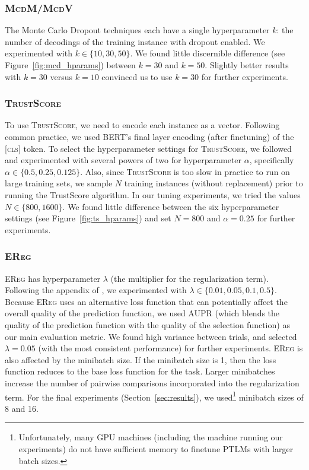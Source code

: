 \documentclass[11pt]{article}
\begin{document}
\subsubsection*{\textsc{McdM/McdV}}

The Monte Carlo Dropout techniques each have a single hyperparameter $k$: the number of decodings of the training instance with dropout enabled. We experimented with $k \in \{10, 30, 50\}$. We found little discernible difference (see Figure~\ref{fig:mcd_hparams}) between $k=30$ and $k=50$. Slightly better results with $k=30$ versus $k=10$ convinced us to use $k=30$ for further experiments.


\subsubsection*{\textsc{TrustScore}}

To use \textsc{TrustScore}, we need to encode each instance as a vector. Following common practice, we used BERT's final layer encoding (after finetuning) of the \textsc{[cls]} token. To select the hyperparameter settings for \textsc{TrustScore}, we followed \cite{jiang2018trust} and experimented with several powers of two for hyperparameter $\alpha$, specifically $\alpha \in \{0.5, 0.25, 0.125\}$. Also, since \textsc{TrustScore} is too slow in practice to run on large training sets, we sample $N$ training instances (without replacement) prior to running the TrustScore algorithm. In our tuning experiments, we tried the values $N \in \{800, 1600\}$. We found little difference between the six hyperparameter settings (see Figure~\ref{fig:ts_hparams}) and set $N=800$ and $\alpha=0.25$ for further experiments.

\subsubsection*{\textsc{EReg}}

\textsc{EReg} has hyperparameter $\lambda$ (the multiplier for the regularization term). Following the appendix of \cite{xin-etal-2021-art}, we experimented with $\lambda \in \{0.01, 0.05, 0.1, 0.5\}$. Because \textsc{EReg} uses an alternative loss function that can potentially affect the overall quality of the prediction function, we used AUPR (which blends the quality of the prediction function with the quality of the selection function) as our main evaluation metric. We found high variance between trials, and selected $\lambda = 0.05$ (with the most consistent performance) for further experiments. \textsc{EReg} is also affected by the minibatch size. If the minibatch size is 1, then the loss function reduces to the base loss function for the task. Larger minibatches increase the number of pairwise comparisons incorporated into the regularization term. For the final experiments (Section~\ref{sec:results}), we used\footnote{Unfortunately, many GPU machines (including the machine running our experiments) do not have sufficient memory to finetune PTLMs with larger batch sizes.} minibatch sizes of 8 and 16.
\end{document}
